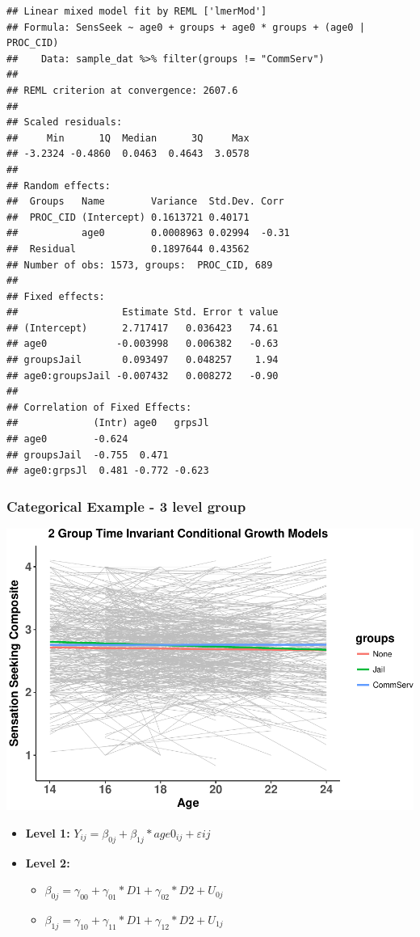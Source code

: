 \documentclass[]{article}
\begin{document}
\begin{verbatim}
## Linear mixed model fit by REML ['lmerMod']
## Formula: SensSeek ~ age0 + groups + age0 * groups + (age0 | PROC_CID)
##    Data: sample_dat %>% filter(groups != "CommServ")
## 
## REML criterion at convergence: 2607.6
## 
## Scaled residuals: 
##     Min      1Q  Median      3Q     Max 
## -3.2324 -0.4860  0.0463  0.4643  3.0578 
## 
## Random effects:
##  Groups   Name        Variance  Std.Dev. Corr 
##  PROC_CID (Intercept) 0.1613721 0.40171       
##           age0        0.0008963 0.02994  -0.31
##  Residual             0.1897644 0.43562       
## Number of obs: 1573, groups:  PROC_CID, 689
## 
## Fixed effects:
##                  Estimate Std. Error t value
## (Intercept)      2.717417   0.036423   74.61
## age0            -0.003998   0.006382   -0.63
## groupsJail       0.093497   0.048257    1.94
## age0:groupsJail -0.007432   0.008272   -0.90
## 
## Correlation of Fixed Effects:
##             (Intr) age0   grpsJl
## age0        -0.624              
## groupsJail  -0.755  0.471       
## age0:grpsJl  0.481 -0.772 -0.623
\end{verbatim}

\normalsize

\subsubsection{Categorical Example - 3 level
group}\label{categorical-example---3-level-group}

\includegraphics{Conditional_Models_doc_files/figure-latex/unnamed-chunk-11-1.pdf}

\begin{itemize}
  \item \textbf{Level 1:} $Y_{ij} = \beta_{0j} + \beta_{1j}*age0_{ij} + \varepsilon{ij}$
  \item \textbf{Level 2:} 
    \begin{itemize} 
      \item $\beta_{0j} = \gamma_{00} + \gamma_{01}*D1 + \gamma_{02}*D2 + U_{0j}$
      \item $\beta_{1j} = \gamma_{10} + \gamma_{11}*D1 + \gamma_{12}*D2 + U_{1j}$
    \end{itemize}
\end{itemize}
\end{document}
